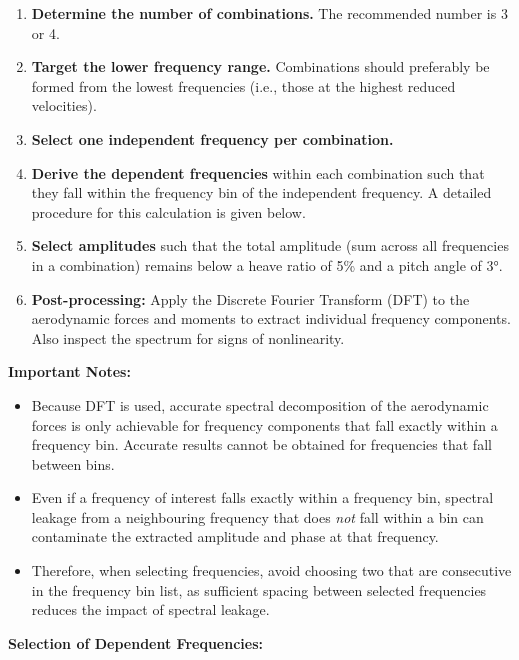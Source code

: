 \documentclass[a4paper, 12pt]{report}
\begin{document}
\begin{enumerate}
    \item \textbf{Determine the number of combinations.} The recommended number is 3 or 4.

    \item \textbf{Target the lower frequency range.} Combinations should preferably be formed 
          from the lowest frequencies (i.e., those at the highest reduced velocities).

    \item \textbf{Select one independent frequency per combination.}

    \item \textbf{Derive the dependent frequencies} within each combination such that they 
          fall within the frequency bin of the independent frequency. A detailed procedure 
          for this calculation is given below.

    \item \textbf{Select amplitudes} such that the total amplitude (sum across all frequencies 
          in a combination) remains below a heave ratio of 5\% and a pitch angle of 3°.

    \item \textbf{Post-processing:} Apply the Discrete Fourier Transform (DFT) to the 
          aerodynamic forces and moments to extract individual frequency components. 
          Also inspect the spectrum for signs of nonlinearity.
\end{enumerate}

\vspace{0.5em}
\textbf{Important Notes:}

\begin{itemize}
    \item Because DFT is used, accurate spectral decomposition of the aerodynamic forces is 
          only achievable for frequency components that fall exactly within a frequency bin. 
          Accurate results cannot be obtained for frequencies that fall between bins.

    \item Even if a frequency of interest falls exactly within a frequency bin, spectral leakage 
          from a neighbouring frequency that does \emph{not} fall within a bin can contaminate 
          the extracted amplitude and phase at that frequency.

    \item Therefore, when selecting frequencies, avoid choosing two that are consecutive 
          in the frequency bin list, as sufficient spacing between selected frequencies 
          reduces the impact of spectral leakage.
\end{itemize}

\vspace{0.5em}
\textbf{Selection of Dependent Frequencies:}
\end{document}
